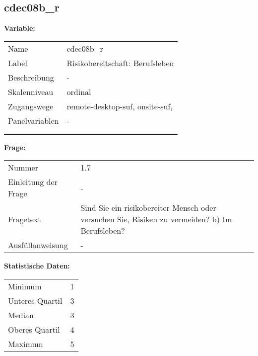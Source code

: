 	
	
	\subsection{cdec08b\_r}
	\label{subSection:cdec08b_r}

	\noindent\textbf{Variable:}\\
		\begin{tabular}{lL{11.3cm}}
			\label{tableVariable:cdec08b_r}
			Name & cdec08b\_r \\
			Label & Risikobereitschaft: Berufsleben \\
			Beschreibung & - \\
			Skalenniveau & ordinal \\
			Zugangswege &
				remote-desktop-suf,
				onsite-suf,
 \\
			Panelvariablen & -
			 \\
			 \\
 \\
		\end{tabular}

		\vspace*{1 cm}
		\noindent\textbf{Frage:}\\
		\begin{tabular}{lL{11.3cm}}
			\label{tableQuestion:cdec08b_r}
			Nummer & 1.7 \\
			Einleitung der Frage & - \\
			Fragetext & Sind Sie ein risikobereiter Mensch oder versuchen Sie, Risiken zu vermeiden?
b) Im Berufsleben? \\
			Ausfüllanweisung & - \\
		\end{tabular}


		\vspace*{1 cm}
		\noindent\textbf{Statistische Daten:}\\
			\begin{tabular}{ll}
				\label{tableStatistics:cdec08b_r}
					Minimum & 1 \\
					Unteres Quartil & 3 \\
					Median & 3 \\
					Oberes Quartil & 4 \\
					Maximum & 5 \\
			\end{tabular}



